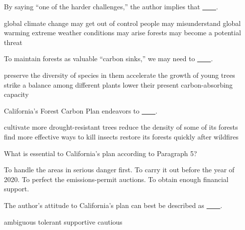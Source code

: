 \item By saying ``one of the harder challenges,'' the author implies that \uline{~~~~}.
\begin{tasks}
	\task global climate change may get out of control
	\task people may misunderstand global warming
	\task extreme weather conditions may arise
	\task forests may become a potential threat
\end{tasks}
\item To maintain forests as valuable ``carbon sinks,'' we may need to \uline{~~~~}.
\begin{tasks}
	\task preserve the diversity of species in them
	\task accelerate the growth of young trees
	\task strike a balance among different plants
	\task lower their present carbon-absorbing capacity
\end{tasks}
\item California's Forest Carbon Plan endeavors to \uline{~~~~}.
\begin{tasks}
	\task cultivate more drought-resistant trees
	\task reduce the density of some of its forests
	\task find more effective ways to kill insects
	\task restore its forests quickly after wildfires
\end{tasks}
\item What is essential to California's plan according to Paragraph 5?
\begin{tasks}
	\task To handle the areas in serious danger first.
	\task To carry it out before the year of 2020.
	\task To perfect the emissions-permit auctions.
	\task To obtain enough financial support.
\end{tasks}
\item The author's attitude to California's plan can best be described as \uline{~~~~}.
\begin{tasks}
	\task ambiguous
	\task tolerant
	\task supportive
	\task cautious
\end{tasks}